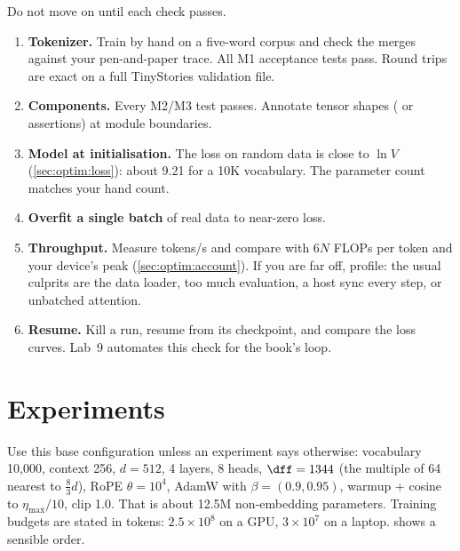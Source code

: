 Do not move on until each check passes.

\begin{enumerate}
  \item \textbf{Tokenizer.} Train by hand on a five-word corpus and check the merges against your
        pen-and-paper trace. All M1 acceptance tests pass. Round trips are exact on a full
        TinyStories validation file.
  \item \textbf{Components.} Every M2/M3 test passes. Annotate tensor shapes
        ( or assertions) at module boundaries.
  \item \textbf{Model at initialisation.} The loss on random data is close to $\ln V$
        (\cref{sec:optim:loss}): about 9.21 for a 10K vocabulary. The parameter count matches your
        hand count.
  \item \textbf{Overfit a single batch} of real data to near-zero loss.
  \item \textbf{Throughput.} Measure tokens/s and compare with $6N$ FLOPs per token and your
        device's peak (\cref{sec:optim:account}). If you are far off, profile: the usual culprits
        are the data loader, too much evaluation, a host sync every step, or unbatched attention.
  \item \textbf{Resume.} Kill a run, resume from its checkpoint, and compare the loss curves.
        Lab~9 automates this check for the book's loop.
\end{enumerate}

\section{Experiments}\label{sec:proj1:experiments}

Use this base configuration unless an experiment says otherwise: vocabulary 10,000, context 256,
$d=512$, 4 layers, 8 heads, $\dff=1344$ (the multiple of 64 nearest to $\tfrac83 d$), RoPE
$\theta=10^4$, AdamW with $\beta=(0.9,0.95)$, warmup + cosine to $\eta_{\max}/10$, clip 1.0. That
is about 12.5M non-embedding parameters. Training budgets are stated in tokens: $2.5\times10^8$
on a GPU, $3\times10^7$ on a laptop.  shows a sensible order.

